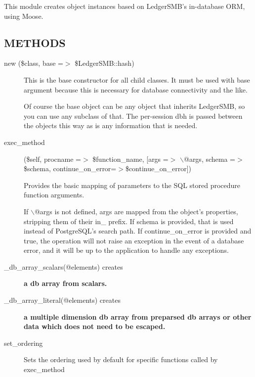 \begin{description}
\begin{description}
\begin{description}
\begin{description}
\begin{description}
\begin{description}
\begin{description}
\begin{description}
\begin{description}
\begin{description}
This module creates object instances based on LedgerSMB's in-database ORM, using Moose.

\subsection*{METHODS\label{LedgerSMB::DBObject_Moose_METHODS}}
\begin{description}

\item[{new (\$class, base =$>$ \$LedgerSMB::hash)}] \mbox{}

This is the base constructor for all child classes.  It must be used with base
argument because this is necessary for database connectivity and the like.



Of course the base object can be any object that inherits LedgerSMB, so you can
use any subclass of that.  The per-session dbh is passed between the objects 
this way as is any information that is needed.


\item[{exec\_method}] \mbox{}

(\$self, procname =$>$ \$function\_name, [args =$>$ $\backslash$@args, schema =$>$ \$schema,
continue\_on\_error=$>$\$continue\_on\_error])



Provides the basic mapping of parameters to the SQL stored procedure function 
arguments.



If $\backslash$@args is not defined, args are mapped from the object's properties, 
stripping them of their in\_ prefix.  If schema is provided, that is used 
instead of PostgreSQL's search path.  If continue\_on\_error is provided and true,
the operation will not raise an exception in the event of a database error, and 
it will be up to the application to handle any exceptions.


\item[{\_db\_array\_scalars(@elements) creates}] \textbf{a db array from scalars.}
\item[{\_db\_array\_literal(@elements) creates}] \textbf{a multiple dimension db array from 	preparsed db arrays or other data which does not need to be escaped.}
\item[{set\_ordering}] \mbox{}

Sets the ordering used by default for specific functions called by exec\_method



\end{description}
\end{description}
\end{description}
\end{description}
\end{description}
\end{description}
\end{description}
\end{description}
\end{description}
\end{description}
\end{description}
